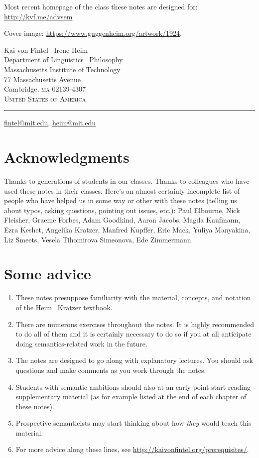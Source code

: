 \noindent Most recent homepage of the class these notes are designed for:\\[6pt]
\null\hfill\url{http://kvf.me/advsem}

\medskip

\noindent Cover image: \url{https://www.guggenheim.org/artwork/1924}.

\vfill

\noindent Kai von Fintel \amp\ Irene Heim\\
Department of Linguistics \amp\ Philosophy\\
Massachusetts Institute of Technology\\
77 Massachusetts Avenue\\
Cambridge, \textsc{ma} 02139-4307\\
\textsc{United States of America} 

\plainbreak{1}

\href{mailto:fintel@mit.edu}{fintel@mit.edu}, \href{mailto:heim@mit.edu}{heim@mit.edu}

\cleardoublepage

\null
\vfill \ba 

\section*{Acknowledgments}

Thanks to generations of students in our classes. Thanks to colleagues who have
used these notes in their classes. Here's an almost certainly incomplete list of
people who have helped us in some way or other with these notes (telling us
about typos, asking questions, pointing out issues, etc.): Paul Elbourne, Nick
Fleisher, Graeme Forbes, Adam Goodkind, Aaron Jacobs, Magda Kaufmann, Ezra
Keshet, Angelika Kratzer, Manfred Kupffer, Eric Mack, Yuliya Manyakina, Liz
Smeets, Vesela Tihomirova Simeonova, Ede Zimmermann.

\section*{Some advice}
\begin{enumerate}
\item These notes presuppose familiarity with the material, concepts, and
  notation of the Heim \amp\ Kratzer textbook.
\item There are numerous exercises throughout the notes. It is highly
  recommended to do all of them and it is certainly necessary to do so if you at
  all anticipate doing semantics-related work in the future.
\item The notes are designed to go along with explanatory lectures. You should
  ask questions and make comments as you work through the notes.
\item Students with semantic ambitions should also at an early point start
  reading supplementary material (as for example listed at the end of each
  chapter of these notes).
\item Prospective semanticists may start thinking about how \emph{they} would
  teach this material.
\item For more advice along these lines, see
  \url{http://kaivonfintel.org/prerequisites/}.
\end{enumerate}


